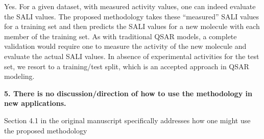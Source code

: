 \documentclass[letterpaper, 12pt]{article}
\begin{document}
Yes. For a given dataset, with measured activity values, one can indeed evaluate the SALI
values. The proposed methodology takes these ``measured'' SALI values for a training set and then
predicts the SALI values for a new molecule with each member of the training set. As with
traditional QSAR models, a complete validation would require one to measure the activity of the new
molecule and evaluate the actual SALI values. In absence of experimental activities for the test
set, we resort to a training/test split, which is an accepted approach in QSAR modeling.

\textbf{5.  There is no discussion/direction of how to use the methodology in new applications.}

Section 4.1 in the original manuscript specifically addresses how one might use the proposed
methodology
\end{document}
